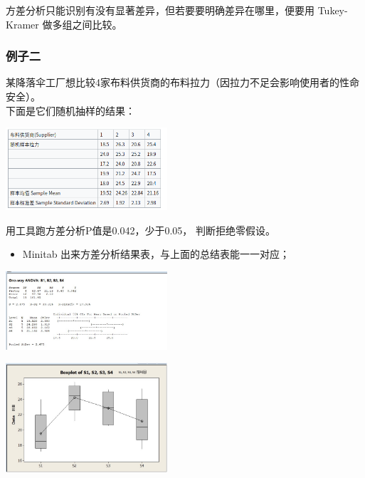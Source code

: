 方差分析只能识别有没有显著差异，但若要要明确差异在哪里，便要用
Tukey-Kramer 做多组之间比较。

\hypertarget{ux4f8bux5b50ux4e8c}{%
\subsubsection{例子二}\label{ux4f8bux5b50ux4e8c}}

某降落伞工厂想比较4家布料供货商的布料拉力（因拉力不足会影响使用者的性命安全）。\\
下面是它们随机抽样的结果：

\includegraphics[width=6cm]{Screenshotfrom2023-11-1003-44-15.png}

用工具跑方差分析P值是0.042，少于0.05， 判断拒绝零假设。

\begin{itemize}
\tightlist
\item
  Minitab 出来方差分析结果表，与上面的总结表能一一对应；
\end{itemize}


\includegraphics[width=6cm]{AnovaParachutes807Screenshot_2022-08-07_124737.jpg}


\includegraphics[width=6cm]{AnovaBoxplots807-1.jpg}


